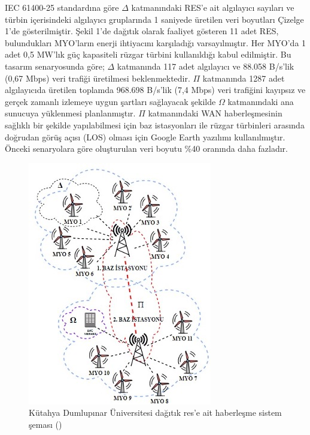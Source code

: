 IEC 61400-25 standardına göre \(\Delta \) katmanındaki RES’e ait algılayıcı sayıları ve türbin içerisindeki algılayıcı gruplarında 1 saniyede üretilen veri boyutları Çizelge 1’de gösterilmiştir.
Şekil 1’de dağıtık olarak faaliyet gösteren 11 adet RES, bulundukları MYO’ların enerji ihtiyacını karşıladığı varsayılmıştır. Her MYO’da 1 adet 0,5 MW’lık güç kapasiteli rüzgar türbini kullanıldığı kabul edilmiştir. Bu tasarım senaryosunda göre; \(\Delta \) katmanında 117 adet algılayıcı ve 88.058 B/s’lik (0,67 Mbps) veri trafiği üretilmesi beklenmektedir. \(\Pi \) katmanında 1287 adet algılayıcıda üretilen toplamda 968.698 B/s’lik (7,4 Mbps) veri trafiğini kayıpsız ve gerçek zamanlı izlemeye uygun şartları sağlayacak şekilde \(\Omega \) katmanındaki ana sunucuya yüklenmesi planlanmıştır. \(\Pi \) katmanındaki WAN haberleşmesinin sağlıklı bir şekilde yapılabilmesi için baz istasyonları ile rüzgar türbinleri arasında doğrudan görüş açısı (LOS) olması için Google Earth yazılımı kullanılmıştır. Önceki senaryolara göre oluşturulan veri boyutu \%40 oranında daha fazladır.






\begin{figure}[htbp]
\centerline{\includegraphics[width= 10 cm]{Resim/donmezReseleco.jpg}}
\caption{Kütahya Dumlupınar Üniversitesi dağıtık \gls{res}'e ait haberleşme sistem şeması (\protect{}) }
\label{fig:donmezcalismaeleco}
\end{figure}

